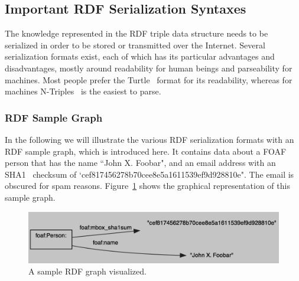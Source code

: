 \documentclass[12pt]{article}
\begin{document}
\subsection{Important RDF Serialization Syntaxes}
The knowledge represented in the RDF triple data structure needs to be serialized in order to be stored or transmitted over the Internet. Several serialization formats exist, each of which has its particular advantages and disadvantages, mostly around readability for human beings and parseability for machines. Most people prefer the Turtle~\cite{turtle} format for its readability, whereas for machines N-Triples~\cite{rdf-n-triples} is the easiest to parse.

\subsubsection{RDF Sample Graph}
In the following we will illustrate the various RDF serialization formats with an RDF sample graph, which is introduced here. It contains data about a FOAF~\cite{FOAF} person that has the name ``John X. Foobar", and an email address with an SHA1~\cite{sha1} checksum of `cef817456278b70cee8e5a1611539\-ef9d928810e". The email is obscured for spam reasons. Figure~\ref{fig:sample-rdf-graph} shows the graphical representation of this sample graph.

\begin{figure}[htbp!]
\begin{center}
 \includegraphics[width=\linewidth]{./resources/sample-rdf-graph.png} 
 \caption{A sample RDF graph visualized.}
 \label{fig:sample-rdf-graph}
 \end{center}  
\end{figure}
\end{document}
